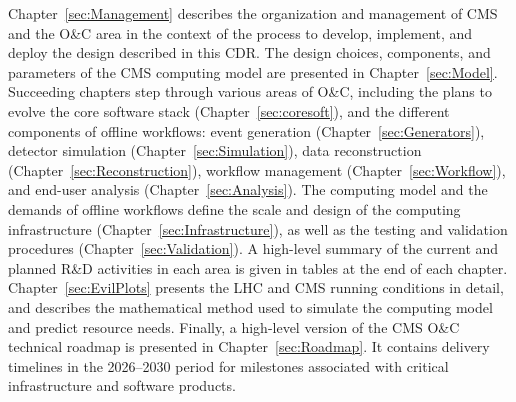 Chapter~\ref{sec:Management} describes the organization and management of CMS and the O\&C area in the context of the process to develop, implement, and deploy the design described in this \gls{CDR}. The design choices, components, and parameters of the CMS computing model are presented in Chapter~\ref{sec:Model}.
Succeeding chapters step through various areas of O\&C, including the plans to evolve the core software stack (Chapter~\ref{sec:coresoft}), and the different components of offline workflows: event generation (Chapter~\ref{sec:Generators}), detector simulation (Chapter~\ref{sec:Simulation}), data reconstruction (Chapter~\ref{sec:Reconstruction}), workflow management (Chapter~\ref{sec:Workflow}), and end-user analysis (Chapter~\ref{sec:Analysis}). 
The computing model and the demands of offline workflows define the scale and design of the computing infrastructure (Chapter~\ref{sec:Infrastructure}), as well as the testing and validation procedures (Chapter~\ref{sec:Validation}). 
A high-level summary of the current and planned R\&D activities in each area is given in tables at the end of each chapter. 
Chapter~\ref{sec:EvilPlots} presents the LHC and CMS running conditions in detail, and describes the mathematical method used to simulate the computing model and predict resource needs. %
Finally, a high-level version of the CMS O\&C \PhaseTwo technical roadmap is presented in Chapter~\ref{sec:Roadmap}. It contains delivery timelines in the 2026--2030 period for milestones associated with critical infrastructure and software products.

